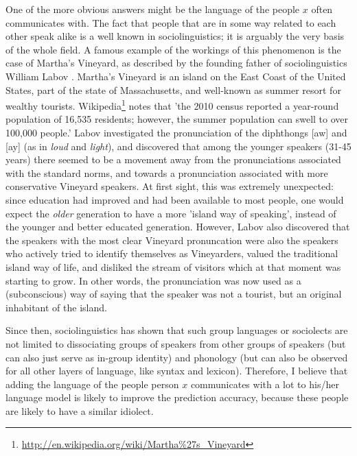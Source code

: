 \documentclass[11pt]{article}
\begin{document}
One of the more obvious answers might be the language of the people $x$ often communicates with. The fact that people that are in some way related to each other speak alike is a well known in sociolinguistics; it is arguably the very basis of the whole field. A famous example of the workings of this phenomenon is the case of Martha's Vineyard, as described by the founding father of sociolinguistics William Labov \cite{labov63}. Martha's Vineyard is an island on the East Coast of the United States, part of the state of Massachusetts, and well-known as summer resort for wealthy tourists. Wikipedia\footnote{\url{http://en.wikipedia.org/wiki/Martha\%27s\_Vineyard}} notes that 'the 2010 census reported a year-round population of 16,535 residents; however, the summer population can swell to over 100,000 people.' Labov investigated the pronunciation of the diphthongs [aw] and [ay] (as in \emph{loud} and \emph{light}), and discovered that among the younger speakers (31-45 years) there seemed to be a movement away from the pronunciations associated with the standard norms, and towards a pronunciation associated with more conservative  Vineyard speakers. At first sight, this was extremely unexpected: since education had improved and had been available to most people, one would expect the \emph{older} generation to have a more 'island way of speaking', instead of the younger and better educated generation. However, Labov also discovered that the speakers with the most clear Vineyard pronuncation were also the speakers who actively tried to identify themselves as Vineyarders, valued the traditional island way of life, and disliked the stream of visitors which at that moment was starting to grow. In other words, the pronunciation was now used as a (subconscious) way of saying that the speaker was not a tourist, but an original inhabitant of the island.

Since then, sociolinguistics has shown that such group languages or sociolects are not limited to dissociating groups of speakers from other groups of speakers (but can also just serve as in-group identity) and phonology (but can also be observed for all other layers of language, like syntax and lexicon). Therefore, I believe that adding the language of the people person $x$ communicates with a lot to his/her language model is likely to improve the prediction accuracy, because these people are likely to have a similar idiolect.
\end{document}
